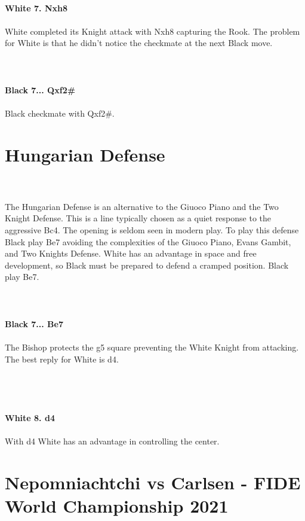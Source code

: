 \documentclass{article}
\begin{document}
\\
\textbf{White 7. Nxh8}\\
\\
White completed its Knight attack with Nxh8 capturing the Rook. The problem for White is that he didn't notice the checkmate at the next Black move.\\
\\

\\
\\
\textbf{Black 7... Qxf2\#}\\
\\
Black checkmate with Qxf2\#.\section{ Hungarian Defense}

\\
\\
The Hungarian Defense is an alternative to the Giuoco Piano and the Two Knight Defense. This is a line typically chosen as a quiet response to the aggressive Bc4. The opening is seldom seen in modern play. To play this defense Black play Be7 avoiding the complexities of the Giuoco Piano, Evans Gambit, and Two Knights Defense. White has an advantage in space and free development, so Black must be prepared to defend a cramped position. Black play Be7.\\
\\

\\
\\
\textbf{Black 7... Be7}\\
\\
The Bishop protects the g5 square preventing the White Knight from attacking. The best reply for White is d4.\\\\
\\

\\
\\
\textbf{White 8. d4}\\
\\
With d4 White has an advantage in controlling the center.\\\section{ Nepomniachtchi vs Carlsen - FIDE World Championship 2021}
\end{document}
